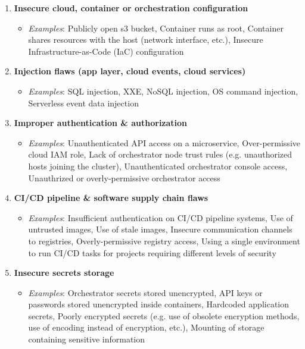 \begin{enumerate}
    \item \textbf{Insecure cloud, container or orchestration configuration}
    \begin{itemize}
        \item \textit{Examples}: Publicly open s3 bucket, Container runs as root, Container shares resources with the host (network interface, etc.), Insecure Infrastructure-as-Code (IaC) configuration\\
    \end{itemize}
    \item \textbf{Injection flaws (app layer, cloud events, cloud services)}
    \begin{itemize}
        \item \textit{Examples}: SQL injection, XXE, NoSQL injection, OS command injection, Serverless event data injection\\
    \end{itemize}
    \item \textbf{Improper authentication \& authorization}
    \begin{itemize}
        \item \textit{Examples}: Unauthenticated API access on a microservice, Over-permissive cloud IAM role, Lack of orchestrator node trust rules (e.g. unauthorized hosts joining the cluster), Unauthenticated orchestrator console access, Unauthrized or overly-permissive orchestrator access\\
    \end{itemize}
    \item \textbf{CI/CD pipeline \& software supply chain flaws}
    \begin{itemize}
        \item \textit{Examples}: Insufficient authentication on CI/CD pipeline systems, Use of untrusted images, Use of stale images, Insecure communication channels to registries, Overly-permissive registry access, Using a single environment to run CI/CD tasks for projects requiring different levels of security\\
    \end{itemize}
    \item \textbf{Insecure secrets storage}
    \begin{itemize}
        \item \textit{Examples}: Orchestrator secrets stored unencrypted, API keys or passwords stored unencrypted inside containers, Hardcoded application secrets, Poorly encrypted secrets (e.g. use of obsolete encryption methods, use of encoding instead of encryption, etc.), Mounting of storage containing sensitive information\\

\end{itemize}
\end{enumerate}
